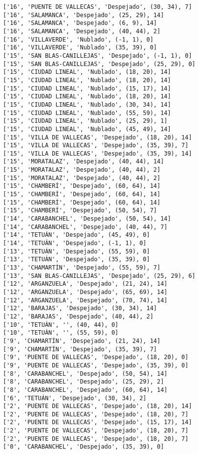 \documentclass[11pt]{article}
\begin{document}
\begin{Verbatim}[commandchars=\\\{\}]
['16', 'PUENTE DE VALLECAS', 'Despejado', (30, 34), 7]
['16', 'SALAMANCA', 'Despejado', (25, 29), 14]
['16', 'SALAMANCA', 'Despejado', (6, 9), 14]
['16', 'SALAMANCA', 'Despejado', (40, 44), 2]
['16', 'VILLAVERDE', 'Nublado', (-1, 1), 0]
['16', 'VILLAVERDE', 'Nublado', (35, 39), 0]
['15', 'SAN BLAS-CANILLEJAS', 'Despejado', (-1, 1), 0]
['15', 'SAN BLAS-CANILLEJAS', 'Despejado', (25, 29), 0]
['15', 'CIUDAD LINEAL', 'Nublado', (18, 20), 14]
['15', 'CIUDAD LINEAL', 'Nublado', (18, 20), 14]
['15', 'CIUDAD LINEAL', 'Nublado', (15, 17), 14]
['15', 'CIUDAD LINEAL', 'Nublado', (18, 20), 14]
['15', 'CIUDAD LINEAL', 'Nublado', (30, 34), 14]
['15', 'CIUDAD LINEAL', 'Nublado', (55, 59), 14]
['15', 'CIUDAD LINEAL', 'Nublado', (25, 29), 1]
['15', 'CIUDAD LINEAL', 'Nublado', (45, 49), 14]
['15', 'VILLA DE VALLECAS', 'Despejado', (18, 20), 14]
['15', 'VILLA DE VALLECAS', 'Despejado', (35, 39), 7]
['15', 'VILLA DE VALLECAS', 'Despejado', (35, 39), 14]
['15', 'MORATALAZ', 'Despejado', (40, 44), 14]
['15', 'MORATALAZ', 'Despejado', (40, 44), 2]
['15', 'MORATALAZ', 'Despejado', (40, 44), 2]
['15', 'CHAMBERÍ', 'Despejado', (60, 64), 14]
['15', 'CHAMBERÍ', 'Despejado', (60, 64), 14]
['15', 'CHAMBERÍ', 'Despejado', (60, 64), 14]
['15', 'CHAMBERÍ', 'Despejado', (50, 54), 7]
['14', 'CARABANCHEL', 'Despejado', (50, 54), 14]
['14', 'CARABANCHEL', 'Despejado', (40, 44), 7]
['14', 'TETUÁN', 'Despejado', (45, 49), 0]
['14', 'TETUÁN', 'Despejado', (-1, 1), 0]
['13', 'TETUÁN', 'Despejado', (55, 59), 0]
['13', 'TETUÁN', 'Despejado', (35, 39), 0]
['13', 'CHAMARTÍN', 'Despejado', (55, 59), 7]
['13', 'SAN BLAS-CANILLEJAS', 'Despejado', (25, 29), 6]
['12', 'ARGANZUELA', 'Despejado', (21, 24), 14]
['12', 'ARGANZUELA', 'Despejado', (65, 69), 14]
['12', 'ARGANZUELA', 'Despejado', (70, 74), 14]
['12', 'BARAJAS', 'Despejado', (30, 34), 14]
['12', 'BARAJAS', 'Despejado', (40, 44), 2]
['10', 'TETUÁN', '', (40, 44), 0]
['10', 'TETUÁN', '', (55, 59), 0]
['9', 'CHAMARTÍN', 'Despejado', (21, 24), 14]
['9', 'CHAMARTÍN', 'Despejado', (35, 39), 7]
['9', 'PUENTE DE VALLECAS', 'Despejado', (18, 20), 0]
['9', 'PUENTE DE VALLECAS', 'Despejado', (35, 39), 0]
['8', 'CARABANCHEL', 'Despejado', (50, 54), 14]
['8', 'CARABANCHEL', 'Despejado', (25, 29), 2]
['8', 'CARABANCHEL', 'Despejado', (60, 64), 14]
['6', 'TETUÁN', 'Despejado', (30, 34), 2]
['2', 'PUENTE DE VALLECAS', 'Despejado', (18, 20), 14]
['2', 'PUENTE DE VALLECAS', 'Despejado', (18, 20), 7]
['2', 'PUENTE DE VALLECAS', 'Despejado', (15, 17), 14]
['2', 'PUENTE DE VALLECAS', 'Despejado', (18, 20), 7]
['2', 'PUENTE DE VALLECAS', 'Despejado', (18, 20), 7]
['0', 'CARABANCHEL', 'Despejado', (35, 39), 0]

\end{Verbatim}
\end{document}
